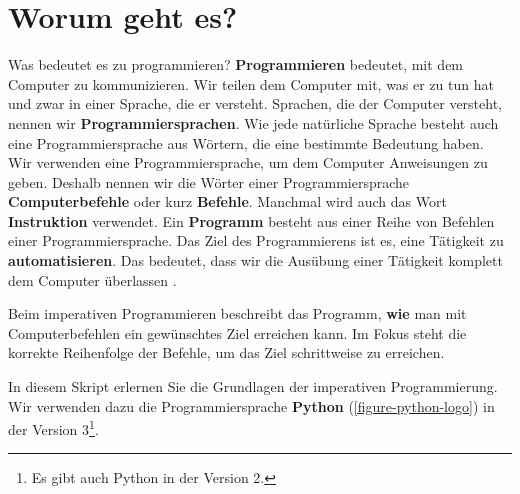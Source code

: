 
\toggletrue{image}
\toggletrue{imagehover}

\chapter{Worum geht es?}
\label{chapter-worum-geht-es}

Was bedeutet es zu programmieren? \textbf{Programmieren} bedeutet, mit dem Computer zu kommunizieren. Wir teilen dem Computer mit, was er zu tun hat und zwar in einer Sprache, die er versteht. Sprachen, die der Computer versteht, nennen wir \textbf{Programmiersprachen}. Wie jede natürliche Sprache besteht auch eine Programmiersprache aus Wörtern, die eine bestimmte Bedeutung haben. Wir verwenden eine Programmiersprache, um dem Computer Anweisungen zu geben. Deshalb nennen wir die Wörter einer Programmiersprache \textbf{Computerbefehle} oder kurz \textbf{Befehle}. Manchmal wird auch das Wort \textbf{Instruktion} verwendet. Ein \textbf{Programm} besteht aus einer Reihe von Befehlen einer Programmiersprache. Das Ziel des Programmierens ist es, eine Tätigkeit zu \textbf{automatisieren}. Das bedeutet, dass wir die Ausübung einer Tätigkeit komplett dem Computer überlassen \cite{einfach-informatik-programmieren}.

\begin{definition}
Beim imperativen Programmieren beschreibt das Programm, \textbf{wie} man mit Computerbefehlen ein gewünschtes Ziel erreichen kann. Im Fokus steht die korrekte Reihenfolge der Befehle, um das Ziel schrittweise zu erreichen.
\end{definition}

In diesem Skript erlernen Sie die Grundlagen der imperativen Programmierung. Wir verwenden dazu die Programmiersprache \textbf{Python} (\autoref{figure-python-logo}) in der Version 3\footnote{Es gibt auch Python in der Version 2.}.

